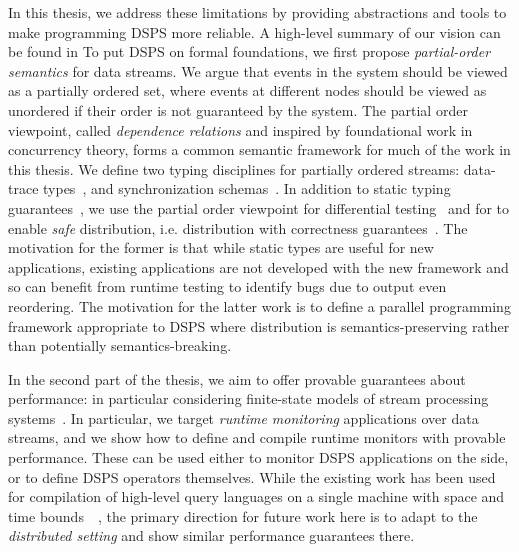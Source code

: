 In this thesis, we address these limitations by providing abstractions and tools to make programming DSPS more reliable.
A high-level summary of our vision can be found in
To put DSPS on formal foundations, we first propose \emph{partial-order semantics} for data streams.
We argue that events in the system should be viewed as a partially ordered set,
where events at different nodes should be viewed as unordered if their order
is not guaranteed by the system.
The partial order viewpoint, called \emph{dependence relations} and inspired by foundational work in concurrency theory,
forms a common semantic framework for much of the work in this thesis.
We define two typing disciplines for partially ordered streams:
data-trace types~,
and synchronization schemas~.
In addition to static typing guarantees~,
we use the partial order viewpoint for differential testing~
and for to enable \emph{safe} distribution, i.e. distribution with correctness guarantees~.
The motivation for the former is that while static types are useful
for new applications, existing applications are not developed with the new
framework and so can benefit from runtime testing to identify bugs due to
output even reordering.
The motivation for the latter work is to define a parallel programming framework appropriate to DSPS where distribution is semantics-preserving
rather than potentially semantics-breaking.


In the second part of the thesis, we aim to offer provable guarantees about performance: in particular considering finite-state models of stream processing systems~.
In particular, we target \emph{runtime monitoring} applications
over data streams, and we show how to define and compile runtime monitors
with provable performance.
These can be used either to monitor DSPS applications on the side,
or to define DSPS operators themselves.
While the existing work has been used for compilation of high-level query languages on a single machine with space and time bounds~~\cite{QRE,StreamQRE},
the primary direction for future work here is to adapt to the \emph{distributed setting} and show similar performance guarantees there.

